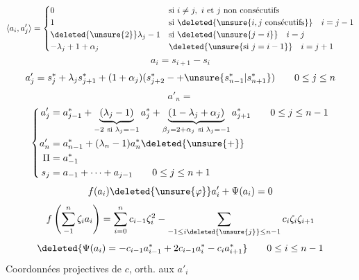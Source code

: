 \[
\langle a_i,a'_j\rangle=
\begin{cases}
0&\text{si }i\neq j,\ i\text{ et }j\text{ non consécutifs}\\
1&\text{si }\deleted{\unsure{i,j\ \text{consécutifs}}}\quad i=j-1\\
\deleted{\unsure{2}}\lambda_j-1&\text{si }\deleted{\unsure{j=i}}\quad i=j\\
-\lambda_j+1+\alpha_j&\deleted{\unsure{\text{si }j=i-1}}\quad i=j+1
\end{cases}
\]
\[
a_i=s_{i+1}-s_i
\]
\[
a'_j=s_j^*+\lambda_js_{j+1}^*+(1+\alpha_j)
(s_{j+2}^*\mathbin{-}+\unsure{s_{n-1}^*|s_{n+1}^*})
\qquad0\leq j\leq n
\]
\[
a'_n=
\]
\[
\left\{\begin{aligned}
a'_j&=a_{j-1}^*
+\underbrace{(\lambda_j-1)}_{-2\ \text{si }\lambda_j=-1}a_j^*
+\underbrace{(1-\lambda_j+\alpha_j)}_{\beta_j=2+\alpha_j\ \text{si }\lambda_j=-1}
a_{j+1}^*
\qquad0\leq j\leq n-1\\
a'_n&=a_{n-1}^*+(\lambda_n-1)a_n^*\deleted{\unsure{+}}\\
\Pi&=a_{-1}^*\\
s_j&=a_{-1}+\cdots+a_{j-1}\qquad0\leq j\leq n+1
\end{aligned}\right.
\]
\margin{\[
\deleted{\boxed{\begin{aligned}
\Psi(a_{-1})&=-a_0^*\\
\Psi(a_n)&=-c_{n-2}a_{n-1}^*+2c_{n-1}a_n^*
\end{aligned}}}
\]}
\[
f(a_i)\deleted{\unsure{\varphi}}a'_i+\Psi(a_i)=0
\]
\[
f\left(\sum_{-1}^{n}\zeta_i a_i\right)
=\sum_{i=0}^{n}c_{i-1}\zeta_i^2
-\sum_{-1\leq i\deleted{\unsure{j}}\leq n-1}c_i\zeta_i\zeta_{i+1}
\]
\[
\deleted{\Psi(a_i)=-c_{i-1}a_{i-1}^*+2c_{i-1}a_i^*-c_i a_{i+1}^*}
\qquad0\leq i\leq n-1
\]
Coordonnées projectives de $c$, orth. aux $a'_i$

